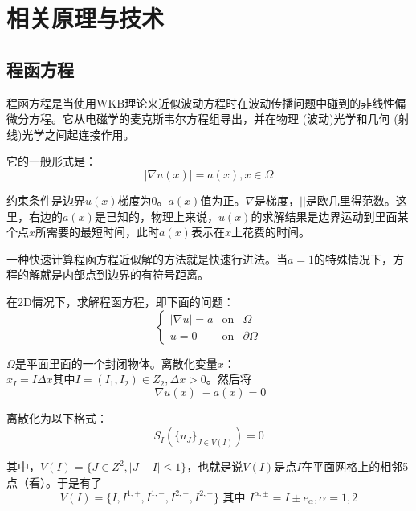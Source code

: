 \chapter{相关原理与技术}
\label{technique}

\section{程函方程}
程函方程是当使用WKB理论来近似波动方程时在波动传播问题中碰到的非线性偏微分方程。它从电磁学的麦克斯韦尔方程组导出，并在物理 (波动)光学和几何 (射线)光学之间起连接作用。

它的一般形式是：
\begin{equation}
    \label{eikonal_equation_1}
    \left| \nabla u(x) \right| = a(x), x \in \Omega
\end{equation}

约束条件是边界$u(x)$梯度为0。$a(x)$值为正。$\nabla$是梯度，$\left| \right|$是欧几里得范数。这里，右边的$a(x)$是已知的，物理上来说，$u(x)$的求解结果是边界运动到里面某个点$x$所需要的最短时间，此时$a(x)$表示在$x$上花费的时间。

一种快速计算程函方程近似解的方法就是快速行进法。当$a = 1$的特殊情况下，方程的解就是内部点到边界的有符号距离。

在2D情况下，求解程函方程，即下面的问题：
\begin{equation*}
    \label{eikonal_equation_2}
    \left\{
    \begin{aligned}
    \left| \nabla u \right| = a & \mbox{on} & \Omega \\
    u = 0 & \mbox{on} &  \partial\Omega
    \end{aligned}
    \right.
\end{equation*}

$\Omega$是平面里面的一个封闭物体。离散化变量$x$：$x_{I} = I\Delta x\mbox{其中}I = (I_{1}, I_{2}) \in Z_{2}, \Delta x > 0$。然后将
\begin{equation*}
    \label{eikonal_equation_3}
    \left| \nabla u(x) \right| - a(x) = 0
\end{equation*}

离散化为以下格式：
\begin{equation*}
    \label{scheme}
    S_{I}(\{u_{J}\}_{J \in V(I)}) = 0
\end{equation*}

其中，$V(I) = \{J \in Z^{2}, \left| J - I \right| \leq 1\}$，也就是说$V(I)$是点$I$在平面网格上的相邻5点（看）。于是有了
\begin{equation*}
    \label{eikonal_equation_4}
    V(I) = \{I, I^{1, +}, I^{1, -}, I^{2, +}, I^{2, -}\} \mbox{ 其中 } I^{\alpha, \pm}  = I \pm e_{\alpha}, \alpha = 1, 2
\end{equation*}

